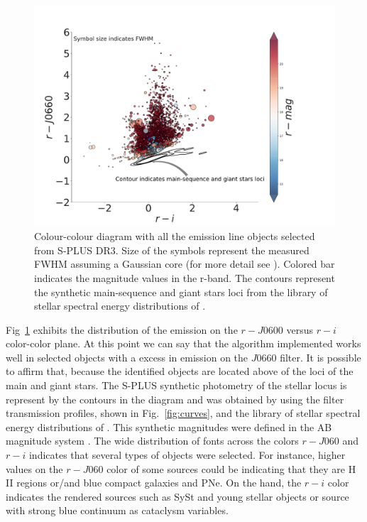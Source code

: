 \documentclass[fleqn,usenatbib]{mnras}
\begin{document}
\begin{figure}
	\includegraphics[width=0.9\linewidth]{Figs/final-emitters.pdf}
        \caption{Colour-colour diagram with all the emission line objects selected
          from S-PLUS DR3. Size of the symbols represent the measured FWHM assuming
          a Gaussian core (for more detail see \citealt{Fernandes:2021}). Colored
          bar indicates the magnitude values in the r-band. The contours represent
          the synthetic main-sequence and giant stars loci from the library of stellar
          spectral energy distributions of \citet{Pickles:1998}.}
    \label{fig:emission}
\end{figure}

Fig~\ref{fig:emission} exhibits the distribution of the emission on the
$r - J0600$ versus $r - i$ color-color plane. At this point we can say that
the algorithm implemented works well in selected objects with a excess in emission
on the $J$0660 filter. It is possible to affirm that, because the identified objects
are located  above of the loci of the main and giant stars. The S-PLUS synthetic  photometry
of the stellar locus is represent by the contours in the diagram and was obtained by using the
filter transmission profiles, shown in Fig.~\ref{fig:curves}, and the library of stellar
spectral energy distributions of \citet{Pickles:1998}. This synthetic magnitudes were
defined in the AB magnitude system \citep{Oke:1983}. The wide distribution of fonts across
the colors $ r - J060 $ and $ r - i $ indicates that several types of objects were selected.
For instance, higher values on the  $r - J060$ color of some sources could be indicating
that they are H II regions or/and blue compact galaxies and PNe. On the hand, the 
$r - i$ color indicates the rendered sources such as SySt and young stellar objects
or source with strong blue continuum as cataclysm variables.
\end{document}
